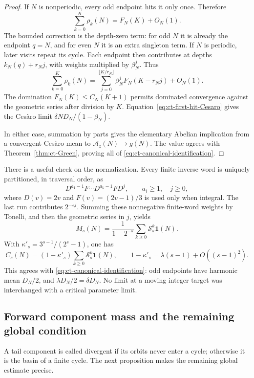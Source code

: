 \begin{proof}
If \(N\) is nonperiodic, every odd endpoint hits it only once.
Therefore
\[
 \sum_{k=0}^K\rho_k(N)=F_N(K)+O_N(1).
\]
The bounded correction is the depth-zero term: for odd \(N\) it
is already the endpoint \(q=N\), and for even \(N\) it is an
extra singleton term.
If \(N\) is periodic, later visits repeat its cycle. Each endpoint
then contributes at depths \(k_N(q)+r_Nj\), with weights multiplied
by \(\beta_N^j\). Thus
\[
 \sum_{k=0}^K\rho_k(N)
 =\sum_{j=0}^{\lfloor K/r_N\rfloor}
                   \beta_N^jF_N(K-r_Nj)+O_N(1).
\]
The domination \(F_N(K)\le C_N(K+1)\) permits dominated
convergence against the geometric series after division by \(K\).
Equation~\eqref{eq:ct-first-hit-Cesaro} gives the Cesàro limit
\(\delta ND_N/(1-\beta_N)\).

In either case, summation by parts gives the elementary Abelian
implication from a convergent Cesàro mean to
\(\mathcal A_z(N)\to g(N)\). The value agrees with
Theorem~\ref{thm:ct-Green}, proving all of
\eqref{eq:ct-canonical-identification}.
\end{proof}

There is a useful check on the normalization. Every finite inverse
word is uniquely partitioned, in traversal order, as
\[
 D^{a_1-1}F\cdots D^{a_k-1}F D^j,\qquad
 a_i\ge1,\quad j\ge0,
\]
where \(D(v)=2v\) and \(F(v)=(2v-1)/3\) is used only when
integral. The last run contributes \(2^{-sj}\).
Summing these nonnegative finite-word weights by Tonelli, and then
the geometric series in \(j\), yields
\[
 M_s(N)=\frac1{1-2^{-s}}\sum_{k\ge0}\mathcal S_s^k\mathbf1(N).
\]
With \(\kappa'_s=3^{s-1}/(2^s-1)\), one has
\[
 C_s(N)=(1-\kappa'_s)\sum_{k\ge0}\mathcal S_s^k\mathbf1(N),
 \qquad 1-\kappa'_s=\lambda(s-1)+O((s-1)^2).
\]
This agrees with \eqref{eq:ct-canonical-identification}: odd
endpoints have harmonic mean \(D_N/2\), and
\(\lambda D_N/2=\delta D_N\). No limit at a moving integer
target was interchanged with a critical parameter limit.

\subsection{Forward component mass and the remaining global condition}

A tail component is called divergent if its orbits never enter a
cycle; otherwise it is the basin of a finite cycle. The next
proposition makes the remaining global estimate precise.

